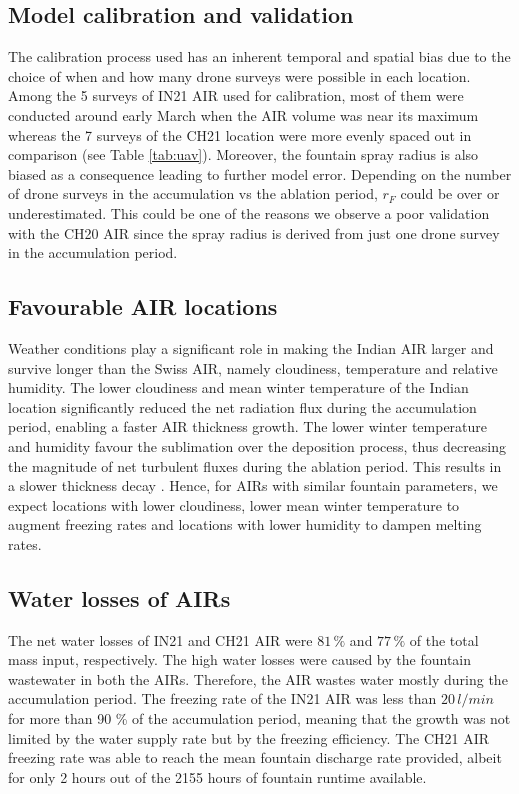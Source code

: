 \documentclass[utf8]{frontiersSCNS}
\begin{document}
\subsection{Model calibration and validation}

The calibration process used has an inherent temporal and spatial bias due to the choice of when and how many
drone surveys were possible in each location. Among the 5 surveys of IN21 AIR used for calibration, most of them
were conducted around early March when the AIR volume was near its maximum whereas the 7 surveys of the CH21
location were more evenly spaced out in comparison (see Table \ref{tab:uav}). Moreover, the fountain spray
radius is also biased as a consequence leading to further model error. Depending on the number of drone surveys
in the accumulation vs the ablation period, $r_F$ could be over or underestimated. This could be one of the
reasons we observe a poor validation with the CH20 AIR since the spray radius is derived from just one drone
survey in the accumulation period.

\subsection{Favourable AIR locations}

Weather conditions play a significant role in making the Indian AIR larger and survive longer than the Swiss
AIR, namely cloudiness, temperature and relative humidity. The lower cloudiness and mean winter temperature of
the Indian location significantly reduced the net radiation flux during the accumulation period, enabling a
faster AIR thickness growth.  The lower winter temperature and humidity favour the sublimation over the
deposition process, thus decreasing the magnitude of net turbulent fluxes during the ablation period. This
results in a slower thickness decay .  Hence, for AIRs with similar fountain parameters, we expect locations
with lower cloudiness, lower mean winter temperature to augment freezing rates and locations with lower humidity
to dampen melting rates.

\subsection{Water losses of AIRs}

The net water losses of IN21 and CH21 AIR were $81\,\%$ and $77\,\%$ of the total mass input, respectively. The
high water losses were caused by the fountain wastewater in both the AIRs. Therefore, the AIR wastes water
mostly during the accumulation period. The freezing rate of the IN21 AIR was less than $20\, l/min$ for more than
90 \% of the accumulation period, meaning that the growth was not limited by the water supply rate but by the
freezing efficiency. The CH21 AIR freezing rate was able to reach the mean fountain discharge rate provided,
albeit for only 2 hours out of the 2155 hours of fountain runtime available. 
\end{document}
